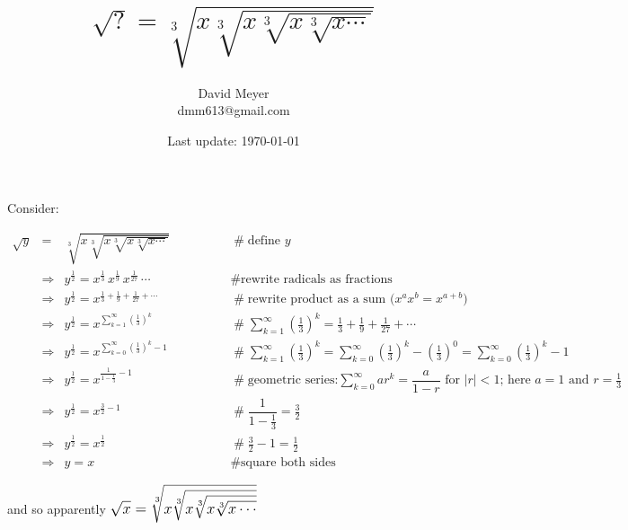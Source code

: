 \documentclass{article}
\title{$\sqrt{?} = \sqrt[3]{ x \sqrt[3] {x \sqrt[3]{x \sqrt[3]{x \cdots}}}}$}
\author{David Meyer \\ dmm613@gmail.com}
\date{Last update: \today}
\theoremstyle{definition}
\begin{document}
\maketitle

\noindent
Consider:

\begin{center}
\begin{equation*}
\begin{array}{llll}
\sqrt{y}
&=&  \sqrt[3]{ x \sqrt[3] {x \sqrt[3]{x \sqrt[3]{x \cdots}}}}
				&\qquad \qquad \mathrel{\#} \text{define $y$} \\
[15pt]
&\Rightarrow& y^{\frac{1}{2}} = x^{\frac{1}{3}} \,  x^{\frac{1}{9}} \,  x^{\frac{1}{27}} \,  \cdots
				&\qquad \qquad \mathrel{\#} \text{rewrite radicals as fractions} \\
[15pt]
&\Rightarrow& y^{\frac{1}{2}} = x^{\frac{1}{3} + \frac{1}{9} + \frac{1}{27} + \cdots}
				&\qquad \qquad \mathrel{\#} \text{rewrite product as a sum ($x^{a}x^{b} = x^{a + b}$)}  \\
[12pt]
&\Rightarrow& y^{\frac{1}{2}} = x^{\sum\limits_{k = 1}^{\infty} {(\frac{1}{3})}^{k}}
				&\qquad \qquad \mathrel{\#} \sum\limits_{k = 1}^{\infty} {(\frac{1}{3})}^{k}  = \frac{1}{3} + \frac{1}{9} + \frac{1}{27} +  \cdots \\
[15pt]
&\Rightarrow& y^{\frac{1}{2}} = x^{\sum\limits_{k = 0}^{\infty} {(\frac{1}{3})}^{k} - 1}
				&\qquad \qquad \mathrel{\#}  \sum\limits_{k = 1}^{\infty} {(\frac{1}{3})}^{k}
				=  \sum\limits_{k = 0}^{\infty} {(\frac{1}{3})}^{k} \! -  {(\frac{1}{3})}^0 
				= \sum\limits_{k = 0}^{\infty} {(\frac{1}{3})}^{k} \! - 1 \\
[15pt]
&\Rightarrow& y^{\frac{1}{2}} = x^{\frac{1}{1- \frac{1}{3}}  - 1}
				&\qquad \qquad \mathrel{\#} \text{geometric series:} \sum\limits_{k = 0}^{\infty}  ar^k  = \dfrac{a}{1-r} \text{ for }  |r| < 1 \text{; here }  a = 1  \text{ and }  r = \frac{1}{3}  \\
[15pt]
&\Rightarrow& y^{\frac{1}{2}} = x^{\frac{3}{2}- 1}
				&\qquad \qquad \mathrel{\#}  \dfrac{1}{1 - \frac{1}{3}}  = \frac{3}{2} \\
[15pt]
&\Rightarrow& y^{\frac{1}{2}} = x^{\frac{1}{2}}
				&\qquad \qquad \mathrel{\#} \frac{3}{2} - 1 = \frac{1}{2} \\
[15pt]
&\Rightarrow& y  = x
				&\qquad \qquad \mathrel{\#} \text{square both sides}
\end{array}
\end{equation*}
\end{center}

\bigskip
\noindent
and so apparently $\mathlarger{\mathlarger{\sqrt{x} = \sqrt[3]{ x \sqrt[3] {x \sqrt[3]{x \sqrt[3]{x \cdots}}}}}}$
\end{document}

